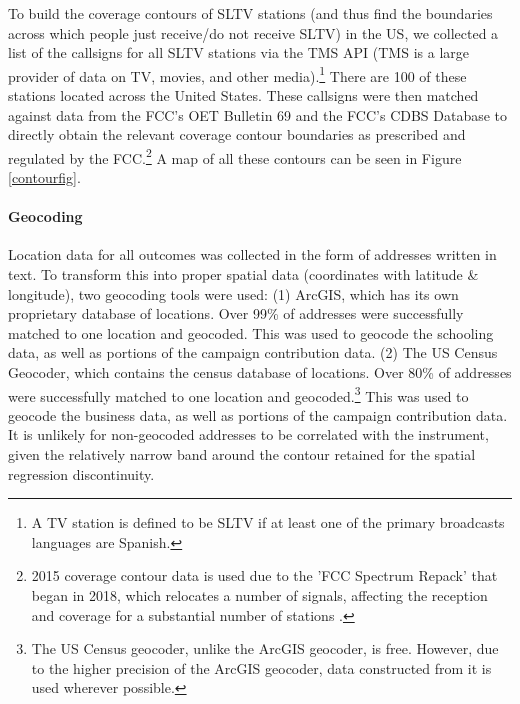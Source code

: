 \documentclass[11pt]{article}
\begin{document}
To build the coverage contours of SLTV stations (and thus find the boundaries across which people just receive/do not receive SLTV) in the US, we collected a list of the callsigns for all SLTV stations via the TMS API (TMS is a large provider of data on TV, movies, and other media).\footnote{ A TV station is defined to be SLTV if at least one of the primary broadcasts languages are Spanish.} There are 100 of these stations located across the United States. These callsigns were then matched against data from the FCC's OET Bulletin 69 and the FCC's CDBS Database to directly obtain the relevant coverage contour boundaries as prescribed and regulated by the FCC.\footnote{ 2015 coverage contour data is used due to the 'FCC Spectrum Repack' that began in 2018, which relocates a number of signals, affecting the reception and coverage for a substantial number of stations \citep{fletcher_fcc_2018}.} 
A map of all these contours can be seen in Figure \ref{contourfig}.

\paragraph{Geocoding}

Location data for all outcomes was collected in the form of addresses written in text. To transform this into proper spatial data (coordinates with latitude \& longitude), two geocoding tools were used: (1) ArcGIS, which has its own proprietary database of locations. Over 99\% of addresses were successfully matched to one location and geocoded. This was used to geocode the schooling data, as well as portions of the campaign contribution data. (2) The US Census Geocoder, which contains the census database of locations. Over 80\% of addresses were successfully matched to one location and geocoded.\footnote{The US Census geocoder, unlike the ArcGIS geocoder, is free. However, due to the higher precision of the ArcGIS geocoder, data constructed from it is used wherever possible. } This was used to geocode the business data, as well as portions of the campaign contribution data. It is unlikely for non-geocoded addresses to be correlated with the instrument, given the relatively narrow band around the contour retained for the spatial regression discontinuity.
\end{document}
